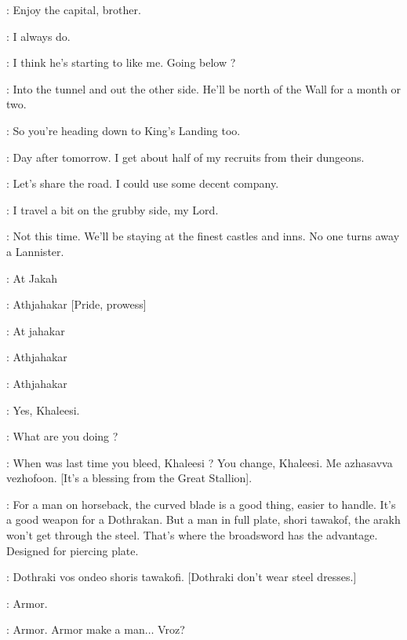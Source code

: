 \BENJEN: Enjoy the capital, brother. 

\YOREN: I always do. 


\TYRION: I think he's starting to like me. Going below ? 

\YOREN: Into the tunnel and out the other side. He'll be north of the Wall for a month or two. 

\TYRION: So you're heading down to King's Landing too. 

\YOREN: Day after tomorrow. I get about half of my recruits from their dungeons. 

\TYRION: Let's share the road. I could use some decent company. 

\YOREN: I travel a bit on the grubby side, my Lord. 

\TYRION: Not this time. We'll be staying at the finest castles and inns. No one turns away a Lannister. 

\scene



\DAENERYS: At Jakah

\IRRI: Athjahakar [Pride, prowess]

\DAENERYS: At jahakar

\IRRI: Athjahakar

\DAENERYS: Athjahakar

\IRRI: Yes, Khaleesi. 


\DAENERYS: What are you doing ? 

\IRRI: When was last time you bleed, Khaleesi ? You change, Khaleesi. Me azhasavva vezhofoon. [It's a blessing from the Great Stallion]. 

\scene


\JORAH: For a man on horseback, the curved blade is a good thing, easier to handle. It's a good weapon for a Dothrakan. But a man in full plate, shori tawakof, the arakh won't get through the steel. That's where the broadsword has the advantage. Designed for piercing plate. 

\RAKHARO: Dothraki vos ondeo shoris tawakofi. [Dothraki don't wear steel dresses.]

\JORAH: Armor. 

\RAKHARO: Armor. Armor make a man$\ldots$ Vroz? 


